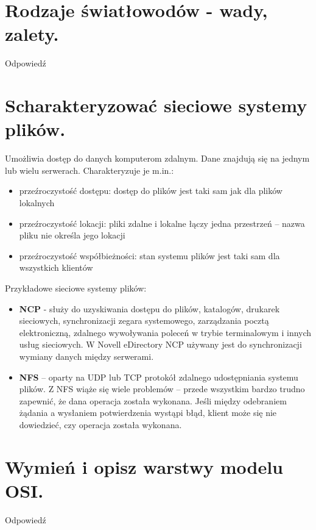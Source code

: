 \documentclass[12pt,a4paper]{article}
\begin{document}
	\section{Rodzaje światłowodów - wady, zalety.}
	Odpowiedź

	\section{Scharakteryzować sieciowe systemy plików.}
	Umożliwia dostęp do danych komputerom zdalnym. Dane znajdują się na jednym lub wielu serwerach. Charakteryzuje je m.in.:
	\begin{itemize}
		\item przeźroczystość dostępu: dostęp do plików jest taki sam jak dla plików lokalnych
		\item przeźroczystość lokacji: pliki zdalne i lokalne łączy jedna przestrzeń -- nazwa pliku nie określa jego lokacji
		\item przeźroczystość współbieżności: stan systemu plików jest taki sam dla wszystkich klientów
	\end{itemize}

	Przykładowe sieciowe systemy plików:
	\begin{itemize}
		\item \textbf{NCP} - służy do uzyskiwania dostępu do plików, katalogów, drukarek sieciowych, synchronizacji zegara systemowego, zarządzania pocztą elektroniczną, zdalnego wywoływania poleceń w trybie terminalowym i innych usług sieciowych. W Novell eDirectory NCP używany jest do synchronizacji wymiany danych między serwerami.
		\item \textbf{NFS} – oparty na UDP lub TCP protokół zdalnego udostępniania systemu plików. Z NFS wiąże się wiele problemów – przede wszystkim bardzo trudno zapewnić, że dana operacja została wykonana. Jeśli między odebraniem żądania a wysłaniem potwierdzenia wystąpi błąd, klient może się nie dowiedzieć, czy operacja została wykonana.
	\end{itemize}

	\section{Wymień i opisz warstwy modelu OSI.}
	Odpowiedź
\end{document}
